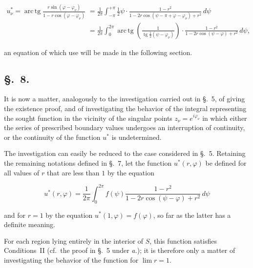 \documentclass{article}
\begin{document}

\[

\begin{aligned}

u_\nu^* = \operatorname{arc\,tg}\frac{r\sin(\varphi - \varphi_\nu)}{1 - r\cos(\varphi - \varphi_\nu)} &= \frac{1}{2\pi} \int_{-\pi}^{+\pi} \frac{1}{2}\psi \cdot \frac{1 - r^2}{1 - 2r\cos(\psi - \pi + \varphi - \varphi_\nu) + r^2}\,d\psi \\

&= \frac{1}{2\pi} \int_0^{2\pi} \operatorname{arc\,tg}\left(\frac{1}{\operatorname{tg}\frac{1}{2}(\psi - \varphi_\nu)}\right) \cdot \frac{1 - r^2}{1 - 2r\cos(\psi - \varphi) + r^2}\,d\psi,

\end{aligned}

\]

an equation of which use will be made in the following section.



\subsection*{§.~8.}



It is now a matter, analogously to the investigation carried out in §.~5, of giving the existence proof, and of investigating the behavior of the integral representing the sought function in the vicinity of the singular points $z_\nu = e^{i\varphi_\nu}$ in which either the series of prescribed boundary values undergoes an interruption of continuity, or the continuity of the function $u^*$ is undetermined.



The investigation can easily be reduced to the case considered in §.~5. Retaining the remaining notations defined in §.~7, let the function $u^*(r, \varphi)$ be defined for all values of $r$ that are less than $1$ by the equation

\[

u^*(r, \varphi) = \frac{1}{2\pi} \int_0^{2\pi} f(\psi) \frac{1 - r^2}{1 - 2r \cos(\psi - \varphi) + r^2}\,d\psi

\]

and for $r = 1$ by the equation $u^*(1, \varphi) = f(\varphi)$, so far as the latter has a definite meaning.



For each region lying entirely in the interior of $S$, this function satisfies Conditions~II (cf.~the proof in §.~5 under \emph{a.}); it is therefore only a matter of investigating the behavior of the function for $\lim r = 1$.
\end{document}
